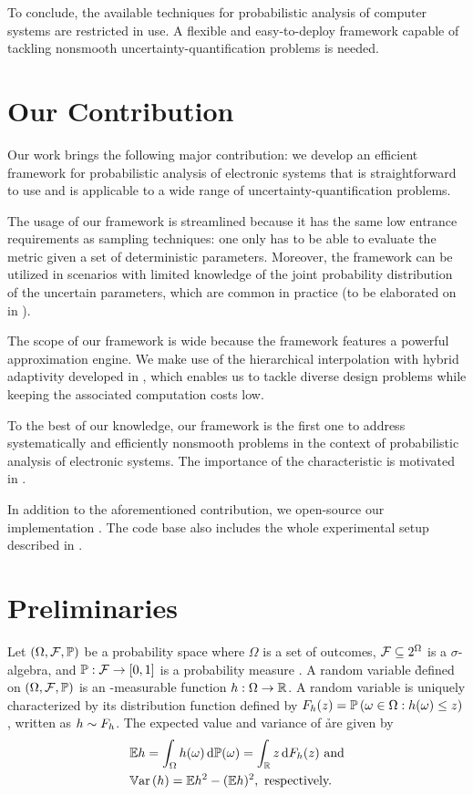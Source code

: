 To conclude, the available techniques for probabilistic analysis of computer
systems are restricted in use. A flexible and easy-to-deploy framework capable
of tackling nonsmooth uncertainty-quantification problems is needed.

\section{Our Contribution}

Our work brings the following major contribution: we develop an efficient
framework for probabilistic analysis of electronic systems that is
straightforward to use and is applicable to a wide range of
uncertainty-quantification problems.

The usage of our framework is streamlined because it has the same low entrance
requirements as sampling techniques: one only has to be able to evaluate the
metric given a set of deterministic parameters. Moreover, the framework can be
utilized in scenarios with limited knowledge of the joint probability
distribution of the uncertain parameters, which are common in practice (to be
elaborated on in ).

The scope of our framework is wide because the framework features a powerful
approximation engine. We make use of the hierarchical interpolation with hybrid
adaptivity developed in \cite{jakeman2012, klimke2006, ma2009}, which enables us
to tackle diverse design problems while keeping the associated computation costs
low.

To the best of our knowledge, our framework is the first one to address
systematically and efficiently nonsmooth problems in the context of
probabilistic analysis of electronic systems. The importance of the
characteristic is motivated in .

In addition to the aforementioned contribution, we open-source our
implementation \cite{sources}. The code base also includes the whole
experimental setup described in .

\section{Preliminaries}

Let $(\Omega, \F, \probability)$ be a probability space where $\Omega$ is a set
of outcomes, $\mathcal{F} \subseteq 2^\Omega$ is a $\sigma$-algebra, and $\probability:
\F \to [0, 1]$ is a probability measure \cite{durrett2010}. A random variable \h
defined on $(\Omega, \F, \probability)$ is an \F-measurable function $h: \Omega
\to \mathbb{R}$. A random variable is uniquely characterized by its distribution
function defined by $F_\h(z) = \probability{\omega \in \Omega: \h(\omega) \leq
z}$, written as $h \sim F_h$. The expected value and variance of \h are given
by
\begin{align*}
  & \expectation{\h} = \int_\Omega \h(\omega) \, \d\probability(\omega) = \int_\real z \, \d F_\h(z) \text{ and} \\
  & \variance{\h} = \expectation{\h^2} - (\expectation{\h})^2, \text{ respectively.}
\end{align*}

